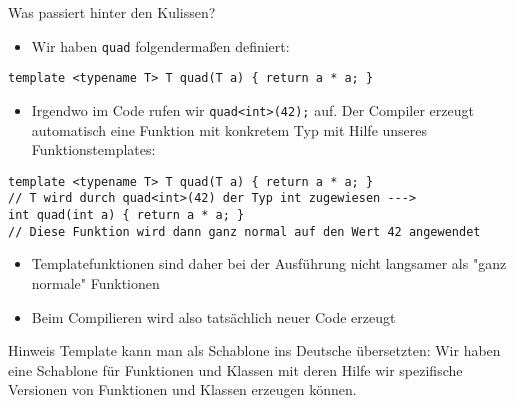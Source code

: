 \documentclass[presentation]{beamer}
\begin{document}
\begin{frame}[fragile,label={sec:org700d2d4}]{Was passiert hinter den Kulissen?}
 \begin{itemize}
\item Wir haben {\color{solarizedYellow}\texttt{quad} }folgendermaßen definiert:
\end{itemize}
\begin{verbatim}
template <typename T> T quad(T a) { return a * a; }
\end{verbatim}
\begin{itemize}
\item Irgendwo im Code rufen wir {\color{solarizedYellow}\texttt{quad<int>(42);} }auf. Der Compiler
\alert{erzeugt automatisch} eine \alert{Funktion mit konkretem Typ} mit Hilfe
unseres Funktionstemplates:
\end{itemize}
\begin{verbatim}
template <typename T> T quad(T a) { return a * a; }
// T wird durch quad<int>(42) der Typ int zugewiesen --->
int quad(int a) { return a * a; }
// Diese Funktion wird dann ganz normal auf den Wert 42 angewendet
\end{verbatim}
\begin{itemize}
\item Templatefunktionen sind daher bei der Ausführung nicht langsamer als
"ganz normale" Funktionen
\item Beim Compilieren wird also tatsächlich \alert{neuer Code erzeugt}
\end{itemize}
\begin{alertblock}{Hinweis}
Template kann man als \alert{Schablone} ins Deutsche übersetzten: Wir haben
eine Schablone für Funktionen und Klassen mit deren Hilfe wir
spezifische Versionen von Funktionen und Klassen erzeugen können.
\end{alertblock}
\end{frame}
\end{document}
